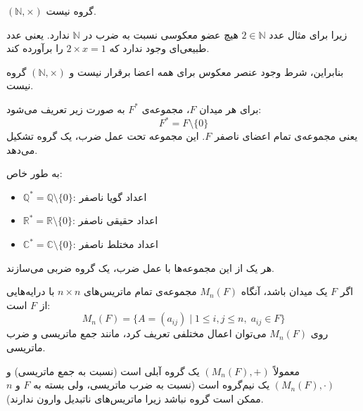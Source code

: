 \begin{example}
    \( (\mathbb{N}, \times) \) گروه نیست.
    
    زیرا برای مثال عدد \( 2 \in \mathbb{N} \) هیچ عضو معکوسی نسبت به ضرب در \( \mathbb{N} \) ندارد.  
    یعنی عدد طبیعی‌ای وجود ندارد که \( 2 \times x = 1 \) را برآورده کند.  
    
    بنابراین، شرط وجود عنصر معکوس برای همه اعضا برقرار نیست و \( (\mathbb{N}, \times) \) گروه نیست.
\end{example}
\begin{definition}
    برای هر میدان \( F \)، مجموعه‌ی \( F^* \) به صورت زیر تعریف می‌شود:
    \[
        F^* = F \setminus \{0\}
    \]
    یعنی مجموعه‌ی تمام اعضای ناصفر \( F \). این مجموعه تحت عمل ضرب، یک گروه تشکیل می‌دهد.
    
    به طور خاص:
    \begin{itemize}
        \item \( \mathbb{Q}^* = \mathbb{Q} \setminus \{0\} \): اعداد گویا ناصفر
        \item \( \mathbb{R}^* = \mathbb{R} \setminus \{0\} \): اعداد حقیقی ناصفر
        \item \( \mathbb{C}^* = \mathbb{C} \setminus \{0\} \): اعداد مختلط ناصفر
    \end{itemize}
    هر یک از این مجموعه‌ها با عمل ضرب، یک گروه ضربی می‌سازند.
\end{definition}


\begin{definition}
    اگر \( F \) یک میدان  باشد، آنگاه \( M_n(F) \) مجموعه‌ی تمام ماتریس‌های \( n \times n \) با درایه‌هایی از \( F \) است:
    \[
        M_n(F) = \{ A = (a_{ij}) \mid 1 \leq i, j \leq n,\; a_{ij} \in F \}
    \]
    روی \( M_n(F) \) می‌توان اعمال مختلفی تعریف کرد، مانند جمع ماتریسی و ضرب ماتریسی.  
    
    معمولاً \( (M_n(F), +) \) یک گروه آبلی است (نسبت به جمع ماتریسی) و \( (M_n(F), \cdot) \) یک نیم‌گروه است (نسبت به ضرب ماتریسی، ولی بسته به \( F \) و \( n \) ممکن است گروه نباشد زیرا ماتریس‌های ناتبدیل وارون ندارند).
\end{definition}

